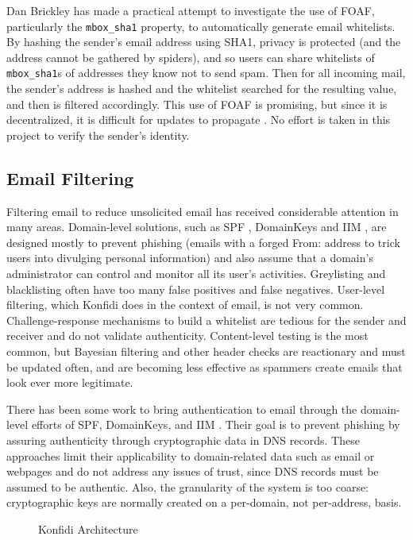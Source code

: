 \documentclass{acm_proc_article-sp}
\begin{document}
Dan Brickley has made a practical attempt to investigate the use of FOAF, particularly the \texttt{mbox\_sha1} property, to automatically generate email whitelists. By hashing the sender's email address using SHA1, privacy is protected (and the address cannot be gathered by spiders), and so users can share whitelists of \texttt{mbox\_sha1}s of addresses they know not to send spam. Then for all incoming mail, the sender's address is hashed and the whitelist searched for the resulting value, and then is filtered accordingly. This use of FOAF is promising, but since it is decentralized, it is difficult for updates to propagate \citep{foafWhitelisting}. No effort is taken in this project to verify the sender's identity.

\subsection{Email Filtering}
Filtering email to reduce unsolicited email has received considerable attention in many areas.  Domain-level solutions, such as SPF \citep{spf}, DomainKeys \citep{domainkeys} and IIM \citep{iim}, are designed mostly to prevent phishing (emails with a forged From: address to trick users into divulging personal information) and also assume that a domain's administrator can control and monitor all its user's activities. Greylisting and blacklisting often have too many false positives and false negatives. User-level filtering, which Konfidi does in the context of email, is not very common. Challenge-response mechanisms to build a whitelist are tedious for the sender and receiver and do not validate authenticity. Content-level testing is the most common, but Bayesian filtering and other header checks are reactionary and must be updated often, and are becoming less effective as spammers create emails that look ever more legitimate.

There has been some work to bring authentication to email through the domain-level efforts of SPF, DomainKeys, and IIM \citep{iim}.  Their goal is to prevent phishing by assuring authenticity through cryptographic data in DNS records.  These approaches limit their applicability to domain-related data such as email or webpages and do not address any issues of trust, since DNS records must be assumed to be authentic.  Also, the granularity of the system is too coarse: cryptographic keys are normally created on a per-domain, not per-address, basis.

\begin{figure*}[htp]
\centering
{}
\caption{Konfidi Architecture}
\label{fig:arch}
\end{figure*}
\end{document}
